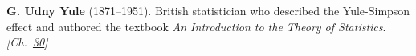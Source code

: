\textbf{G. Udny Yule} (1871–1951). British statistician who described the Yule-Simpson effect and authored the textbook \emph{An Introduction to the Theory of Statistics}. \emph{[Ch.~\hyperref[ch:simpsonsparadox]{30}]}

